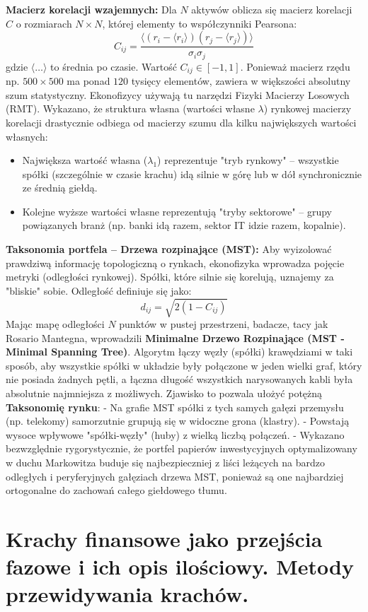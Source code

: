 \documentclass[11pt, a4paper]{article}
\begin{document}
\textbf{Macierz korelacji wzajemnych:}
Dla $N$ aktywów oblicza się macierz korelacji $C$ o rozmiarach $N \times N$, której elementy to współczynniki Pearsona:
\[
C_{ij} = \frac{\langle (r_i - \langle r_i \rangle)(r_j - \langle r_j \rangle) \rangle}{\sigma_i \sigma_j}
\]
gdzie $\langle \dots \rangle$ to średnia po czasie. Wartość $C_{ij} \in [-1, 1]$. Ponieważ macierz rzędu np. $500 \times 500$ ma ponad $120$ tysięcy elementów, zawiera w większości absolutny szum statystyczny. Ekonofizycy używają tu narzędzi Fizyki Macierzy Losowych (RMT). Wykazano, że struktura własna (wartości własne $\lambda$) rynkowej macierzy korelacji drastycznie odbiega od macierzy szumu dla kilku największych wartości własnych:
\begin{itemize}
    \item Największa wartość własna ($\lambda_1$) reprezentuje "tryb rynkowy" – wszystkie spółki (szczególnie w czasie krachu) idą silnie w górę lub w dół synchronicznie ze średnią giełdą.
    \item Kolejne wyższe wartości własne reprezentują "tryby sektorowe" – grupy powiązanych branż (np. banki idą razem, sektor IT idzie razem, kopalnie).
\end{itemize}

\textbf{Taksonomia portfela – Drzewa rozpinające (MST):}
Aby wyizolować prawdziwą informację topologiczną o rynkach, ekonofizyka wprowadza pojęcie metryki (odległości rynkowej). Spółki, które silnie się korelują, uznajemy za "bliskie" sobie. Odległość definiuje się jako:
\[
d_{ij} = \sqrt{2(1 - C_{ij})}
\]
Mając mapę odległości $N$ punktów w pustej przestrzeni, badacze, tacy jak Rosario Mantegna, wprowadzili \textbf{Minimalne Drzewo Rozpinające (MST - Minimal Spanning Tree)}. Algorytm łączy węzły (spółki) krawędziami w taki sposób, aby wszystkie spółki w układzie były połączone w jeden wielki graf, który nie posiada żadnych pętli, a łączna długość wszystkich narysowanych kabli była absolutnie najmniejsza z możliwych.
Zjawisko to pozwala ułożyć potężną \textbf{Taksonomię rynku}:
- Na grafie MST spółki z tych samych gałęzi przemysłu (np. telekomy) samorzutnie grupują się w widoczne grona (klastry).
- Powstają wysoce wpływowe "spółki-węzły" (huby) z wielką liczbą połączeń.
- Wykazano bezwzględnie rygorystycznie, że portfel papierów inwestycyjnych optymalizowany w duchu Markowitza buduje się najbezpieczniej z liści leżących na bardzo odległych i peryferyjnych gałęziach drzewa MST, ponieważ są one najbardziej ortogonalne do zachowań całego giełdowego tłumu.

\section{Krachy finansowe jako przejścia fazowe i ich opis ilościowy. Metody przewidywania krachów.}
\end{document}
